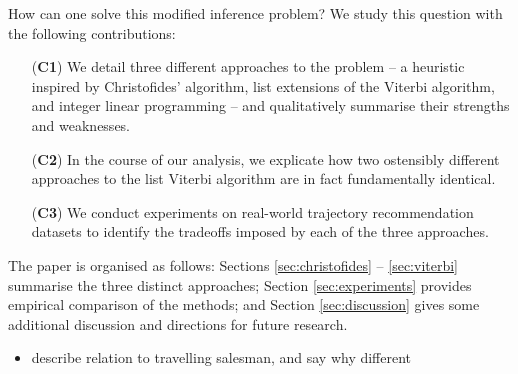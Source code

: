 How can one solve this modified inference problem?
We study this question with the following contributions:
\begin{enumerate}
	\item[(\textbf{C1})] We detail three different approaches to the problem -- a heuristic inspired by Christofides' algorithm, list extensions of the Viterbi algorithm, and integer linear programming -- and qualitatively summarise their strengths and weaknesses.
	\item[(\textbf{C2})] In the course of our analysis, we explicate how two ostensibly different approaches to the list Viterbi algorithm \citep{seshadri1994list,nilsson2001sequentially} are in fact fundamentally identical.
	\item[(\textbf{C3})] We conduct experiments on real-world trajectory recommendation datasets to identify the tradeoffs imposed by each of the three approaches.
\end{enumerate}

The paper is organised as follows:
Sections \ref{sec:christofides} -- \ref{sec:viterbi} summarise the three distinct approaches;
Section \ref{sec:experiments} provides empirical comparison of the methods;
and Section \ref{sec:discussion} gives some additional discussion and directions for future research.

{\color{red!75}
\begin{itemize}
	\item describe relation to travelling salesman, and say why different
\end{itemize}
}
